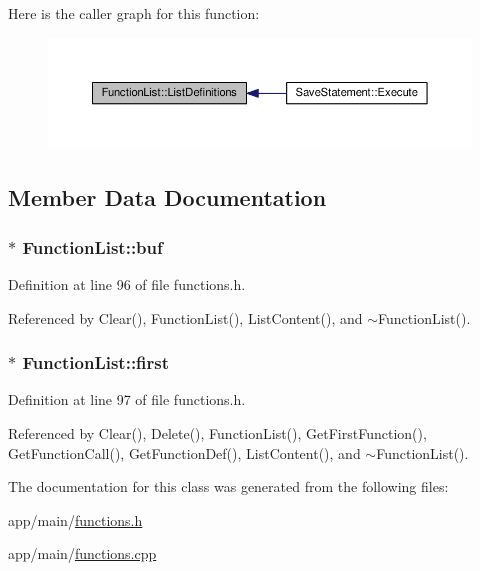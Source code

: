 Here is the caller graph for this function\+:
\nopagebreak
\begin{figure}[H]
\begin{center}
\leavevmode
\includegraphics[width=350pt]{d1/d79/classFunctionList_af69593a40790f4d696a74e46c3c9e552_icgraph}
\end{center}
\end{figure}




\subsection{Member Data Documentation}
\subsubsection[{\texorpdfstring{buf}{buf}}]{$\ast$ Function\+List\+::buf\hspace{0.3cm}{\ttfamily [private]}}\hypertarget{classFunctionList_aa69c3feda1c4a6133fe821982b418c39}{}\label{classFunctionList_aa69c3feda1c4a6133fe821982b418c39}


Definition at line 96 of file functions.\+h.



Referenced by Clear(), Function\+List(), List\+Content(), and $\sim$\+Function\+List().

\subsubsection[{\texorpdfstring{first}{first}}]{$\ast$ Function\+List\+::first\hspace{0.3cm}{\ttfamily [private]}}\hypertarget{classFunctionList_a4a0534f4240022c58c3e06234e7f9f99}{}\label{classFunctionList_a4a0534f4240022c58c3e06234e7f9f99}


Definition at line 97 of file functions.\+h.



Referenced by Clear(), Delete(), Function\+List(), Get\+First\+Function(), Get\+Function\+Call(), Get\+Function\+Def(), List\+Content(), and $\sim$\+Function\+List().



The documentation for this class was generated from the following files\+:\begin{DoxyCompactItemize}
\item 
app/main/\hyperlink{functions_8h}{functions.\+h}\item 
app/main/\hyperlink{functions_8cpp}{functions.\+cpp}\end{DoxyCompactItemize}
